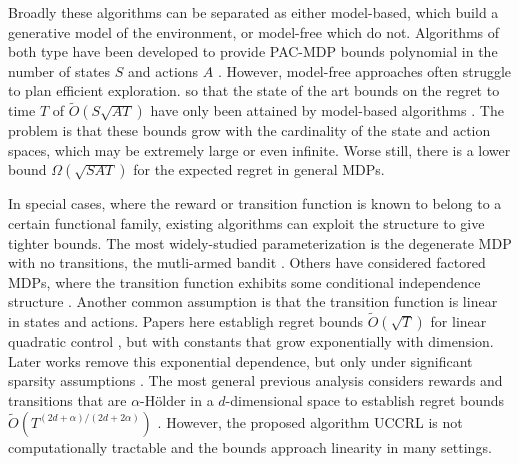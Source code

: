 \documentclass{article}
\begin{document}

Broadly these algorithms can be separated as either model-based, which build a generative model of the environment, or model-free which do not.
Algorithms of both type have been developed to provide PAC-MDP bounds polynomial in the number of states $S$ and actions $A$ \cite{kearns2002near,brafman2003r,strehl2006pac}.
However, model-free approaches often struggle to plan efficient exploration. so that the state of the art bounds on the regret to time $T$ of $\tilde{O}(S\sqrt{AT})$ have only been attained by model-based algorithms \cite{jaksch2010near,osband2013more}.
The problem is that these bounds grow with the cardinality of the state and action spaces, which may be extremely large or even infinite.
Worse still, there is a lower bound $\Omega ( \sqrt{SAT} )$ \cite{jaksch2010near} for the expected regret in general MDPs.

In special cases, where the reward or transition function is known to belong to a certain functional family, existing algorithms can exploit the structure to give tighter bounds.
The most widely-studied parameterization is the degenerate MDP with no transitions, the mutli-armed bandit \cite{auer2003using,bubeck2011xarmed,russo2013}.
Others have considered factored MDPs, where the transition function exhibits some conditional independence structure \cite{osband2014near}.
Another common assumption is that the transition function is linear in states and actions.
Papers here establigh regret bounds $\tilde{O}(\sqrt{T})$ for linear quadratic control \cite{abbasi2011improved}, but with constants that grow exponentially with dimension.
Later works remove this exponential dependence, but only under significant sparsity assumptions \cite{ibrahimi2012efficient}.
The most general previous analysis considers rewards and transitions that are $\alpha$-H\"{o}lder in a $d$-dimensional space to establish regret bounds $\tilde{O}(T^{(2d+\alpha)/(2d+2\alpha)})$ \cite{ortner2012online}.
However, the proposed algorithm UCCRL is not computationally tractable and the bounds approach linearity in many settings.
\end{document}

